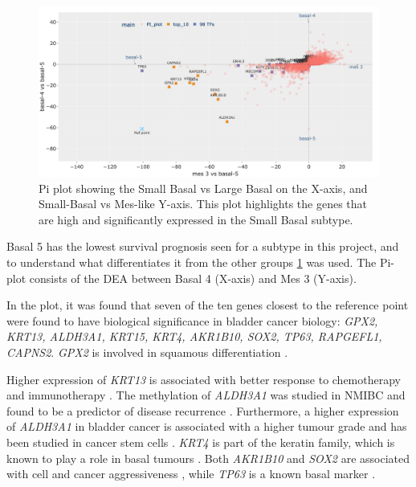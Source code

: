 \begin{figure}[!htb]   
    \centering
    \includegraphics[width=1.0\textwidth,keepaspectratio]{Sections/Network_I/Resources/selective_pruning/pi_gsea/pi_smallBasal.png}
      \caption[Pi-plot - Basal group with the poorest survival]{Pi plot showing the Small Basal vs Large Basal on the X-axis, and Small-Basal vs Mes-like Y-axis. This plot highlights the genes that are high and significantly expressed in the Small Basal subtype. }
    \label{fig:N_I:pi_smallBasal_comp}
\end{figure}


Basal 5 has the lowest survival prognosis seen for a subtype in this project, and to understand what differentiates it from the other groups \cref{fig:N_I:pi_smallBasal_comp} was used. The Pi-plot consists of the DEA between Basal 4 (X-axis) and Mes 3 (Y-axis).

In the plot, it was found that seven of the ten genes closest to the reference point were found to have biological significance in bladder cancer biology: \textit{GPX2, KRT13, ALDH3A1, KRT15, KRT4, AKR1B10, SOX2, TP63, RAPGEFL1, CAPNS2}. \textit{GPX2} is involved in squamous differentiation \citet{Naiki2018-fp}. 

Higher expression of \textit{KRT13} is associated with better response to chemotherapy and immunotherapy \citep{Yu2023-db}. The methylation of \textit{ALDH3A1} was studied in \gls{NMIBC} and found to be a predictor of disease recurrence \citep{McLean2023-qk}. Furthermore, a higher expression of \textit{ALDH3A1} in bladder cancer is associated with a higher tumour grade and has been studied in cancer stem cells \citep{Kim2013-th}. \textit{KRT4} is part of the keratin family, which is known to play a role in basal tumours \citep{Marzouka2018-ge}. Both \textit{AKR1B10} and \textit{SOX2} are associated with cell and cancer aggressiveness \citep{Huang2021-bn, Chiu2020-xh}, while \textit{TP63} is a known basal marker \citep{Choi2012-kk,Karni-Schmidt2011-ps, Choi2014-ed}. 

